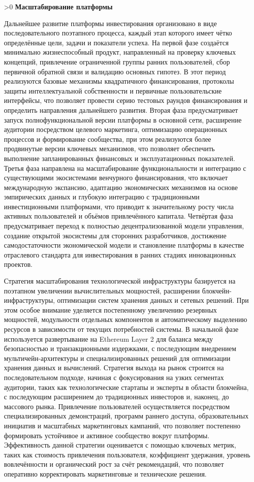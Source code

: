 \documentclass[
    14pt,
    specialist,
    candidate, %
    subf, %
    href,
    times,
    dotsinheaders=false,
    colorlinks=false
]{disser}
\newcommand{\mysection}[1]{%
  \ifnum\value{section}>0
  \vspace{1em}
  \fi
  \refstepcounter{section}
  \hypertarget{sec:\thechapter.\thesection}{}%
  \textbf{\thesection\space #1}
  \addcontentsline{toc}{section}{\texorpdfstring{\thesection\hspace{2em}#1}{Section \thesection}}%
}
\renewcommand{\thechapter}{\arabic{chapter}}
\begin{document}
\mysection{Масштабирование платформы}

Дальнейшее развитие платформы инвестирования организовано в виде последовательного поэтапного процесса, каждый этап которого имеет чётко определённые цели, задачи и показатели успеха. На первой фазе создаётся минимально жизнеспособный продукт, направленный на проверку ключевых концепций, привлечение ограниченной группы ранних пользователей, сбор первичной обратной связи и валидацию основных гипотез. В этот период реализуются базовые механизмы квадратичного финансирования, протоколы защиты интеллектуальной собственности и первичные пользовательские интерфейсы, что позволяет провести серию тестовых раундов финансирования и определить направления дальнейшего развития. Вторая фаза предусматривает запуск полнофункциональной версии платформы в основной сети, расширение аудитории посредством целевого маркетинга, оптимизацию операционных процессов и формирование сообщества, при этом реализуются более продвинутые версии ключевых механизмов, что позволяет обеспечить выполнение запланированных финансовых и эксплуатационных показателей. Третья фаза направлена на масштабирование функциональности и интеграцию с существующими экосистемами венчурного финансирования, что включает международную экспансию, адаптацию экономических механизмов на основе эмпирических данных и глубокую интеграцию с традиционными инвестиционными платформами, что приводит к значительному росту числа активных пользователей и объёмов привлечённого капитала. Четвёртая фаза предусматривает переход к полностью децентрализованной модели управления, создание открытой экосистемы для сторонних разработчиков, достижение самодостаточности экономической модели и становление платформы в качестве отраслевого стандарта для инвестирования в ранних стадиях инновационных проектов.

Стратегия масштабирования технологической инфраструктуры базируется на поэтапном увеличении вычислительных мощностей, расширении блокчейн-инфраструктуры, оптимизации систем хранения данных и сетевых решений. При этом особое внимание уделяется постепенному увеличению резервных мощностей, модульности отдельных компонентов и автоматическому выделению ресурсов в зависимости от текущих потребностей системы. В начальной фазе используется развертывание на Ethereum Layer 2 для баланса между безопасностью и транзакционными издержками, с последующим внедрением мультичейн-архитектуры и специализированных решений для оптимизации хранения данных и вычислений. Стратегия выхода на рынок строится на последовательном подходе, начиная с фокусирования на узких сегментах аудитории, таких как технологические стартапы и эксперты в области блокчейна, с последующим расширением до традиционных инвесторов и, наконец, до массового рынка. Привлечение пользователей осуществляется посредством специализированных демонстраций, программ раннего доступа, образовательных инициатив и масштабных маркетинговых кампаний, что позволяет постепенно формировать устойчивое и активное сообщество вокруг платформы. Эффективность данной стратегии оценивается с помощью ключевых метрик, таких как стоимость привлечения пользователя, коэффициент удержания, уровень вовлечённости и органический рост за счёт рекомендаций, что позволяет оперативно корректировать маркетинговые и технические решения.
\end{document}
